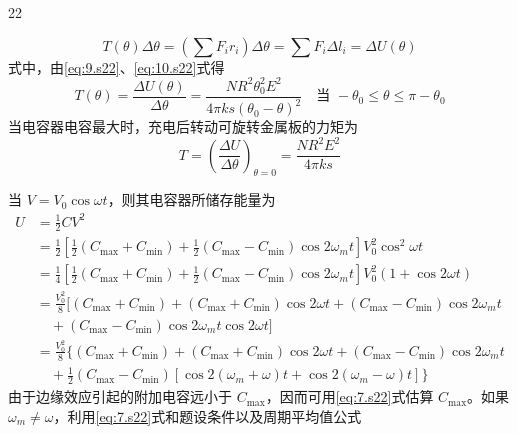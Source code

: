 \begin{solution}{22}
\begin{subsolution}
\begin{equation}
            T(\theta)\Delta\theta = \left(\sum F_i r_i\right)\Delta\theta = \sum F_i \Delta l_i = \Delta U(\theta)
            \label{eq:10.s22}
        \end{equation}
        式中，由\eqref{eq:9.s22}、\eqref{eq:10.s22}式得
        \begin{equation}
            T(\theta) = \frac{\Delta U(\theta)}{\Delta\theta} = \frac{N R^2 \theta_0^2 E^2}{4\pi k s (\theta_0 - \theta)^2} \quad \text{当 } -\theta_0 \leq \theta \leq \pi - \theta_0
            \label{eq:11.s22}
        \end{equation}
        当电容器电容最大时，充电后转动可旋转金属板的力矩为
        \begin{equation}
            T = \left(\frac{\Delta U}{\Delta\theta}\right)_{\theta = 0} = \frac{N R^2 E^2}{4\pi k s}
            \label{eq:12.s22}
        \end{equation}
    \end{subsolution}
    \begin{subsolution}
        当 $V = V_0\cos\omega t$，则其电容器所储存能量为
        \begin{align}
            U &= \frac{1}{2}CV^2 \nonumber \\
            &= \frac{1}{2}\left[\frac{1}{2}(C_{\max} + C_{\min}) + \frac{1}{2}(C_{\max} - C_{\min})\cos 2\omega_m t\right] V_0^2 \cos^2\omega t \nonumber \\
            &= \frac{1}{4}\left[\frac{1}{2}(C_{\max} + C_{\min}) + \frac{1}{2}(C_{\max} - C_{\min})\cos 2\omega_m t\right] V_0^2 (1 + \cos 2\omega t) \nonumber \\
            &= \frac{V_0^2}{8}\bigl[(C_{\max} + C_{\min}) + (C_{\max} + C_{\min})\cos 2\omega t + (C_{\max} - C_{\min})\cos 2\omega_m t \nonumber \\
            &\quad + (C_{\max} - C_{\min})\cos 2\omega_m t \cos 2\omega t\bigr] \nonumber \\
            &= \frac{V_0^2}{8}\bigl\{(C_{\max} + C_{\min}) + (C_{\max} + C_{\min})\cos 2\omega t + (C_{\max} - C_{\min})\cos 2\omega_m t \nonumber \\
            &\quad + \frac{1}{2}(C_{\max} - C_{\min})[\cos 2(\omega_m + \omega)t + \cos 2(\omega_m - \omega)t]\bigr\}
            \label{eq:13.s22}
        \end{align}
        由于边缘效应引起的附加电容远小于 $C_{\max}$，因而可用\eqref{eq:7.s22}式估算 $C_{\max}$。如果 $\omega_m \neq \omega$，利用\eqref{eq:7.s22}式和题设条件以及周期平均值公式
        \begin{equation}

\end{equation}
\end{subsolution}
\end{solution}
